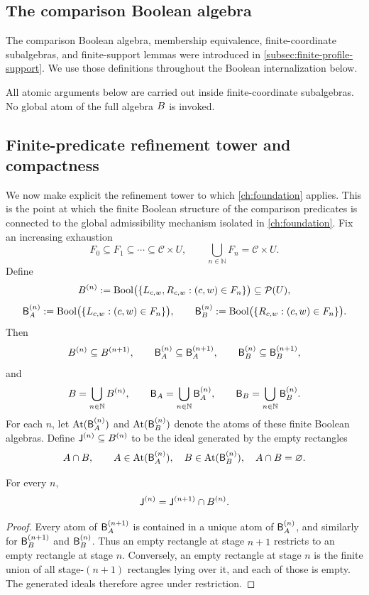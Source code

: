 \subsection{The comparison Boolean algebra}
The comparison Boolean algebra, membership equivalence, finite-coordinate
subalgebras, and finite-support lemmas were introduced in
\cref{subsec:finite-profile-support}. We use those definitions throughout
the Boolean internalization below.
\begin{remark}
	All atomic arguments below are carried out inside finite-coordinate
	subalgebras. No global atom of the full algebra \(B\) is invoked.
\end{remark}
\subsection{Finite-predicate refinement tower and compactness}
\label{subsec:refinement-compactness}
We now make explicit the refinement tower to which
\cref{ch:foundation} applies. This is the point at which the finite
Boolean structure of the comparison predicates is connected to the
global admissibility mechanism isolated in \cref{ch:foundation}.
Fix an increasing exhaustion
\[
	F_0\subseteq F_1\subseteq\cdots\subseteq \mathcal C\times U,
	\qquad
	\bigcup_{n\in\mathbb N}F_n=\mathcal C\times U.
\]
Define
\[
	B^{(n)}
	:=
	\operatorname{Bool}\bigl(\{L_{c,w},R_{c,w}:(c,w)\in F_n\}\bigr)
	\subseteq \mathcal P(U),
\]
\[
	\mathsf B_A^{(n)}
	:=
	\operatorname{Bool}\bigl(\{L_{c,w}:(c,w)\in F_n\}\bigr),
	\qquad
	\mathsf B_B^{(n)}
	:=
	\operatorname{Bool}\bigl(\{R_{c,w}:(c,w)\in F_n\}\bigr).
\]
Then
\[
	B^{(n)}\subseteq B^{(n+1)},
	\qquad
	\mathsf B_A^{(n)}\subseteq \mathsf B_A^{(n+1)},
	\qquad
	\mathsf B_B^{(n)}\subseteq \mathsf B_B^{(n+1)},
\]
and
\[
	B=\bigcup_{n\in\mathbb N}B^{(n)},
	\qquad
	\mathsf B_A=\bigcup_{n\in\mathbb N}\mathsf B_A^{(n)},
	\qquad
	\mathsf B_B=\bigcup_{n\in\mathbb N}\mathsf B_B^{(n)}.
\]
For each \(n\), let \(\mathrm{At}(\mathsf B_A^{(n)})\) and
\(\mathrm{At}(\mathsf B_B^{(n)})\) denote the atoms of these finite Boolean
algebras. Define \(\mathsf J^{(n)}\subseteq B^{(n)}\) to be the ideal
generated by the empty rectangles
\[
	A\cap B,
	\qquad
	A\in\mathrm{At}(\mathsf B_A^{(n)}),
	\quad
	B\in\mathrm{At}(\mathsf B_B^{(n)}),
	\quad
	A\cap B=\varnothing.
\]
\begin{lemma}
	For every \(n\),
	\[
		\mathsf J^{(n)}=\mathsf J^{(n+1)}\cap B^{(n)}.
	\]
\end{lemma}
\begin{proof}
	Every atom of \(\mathsf B_A^{(n+1)}\) is contained in a unique atom of
	\(\mathsf B_A^{(n)}\), and similarly for \(\mathsf B_B^{(n+1)}\) and \(\mathsf B_B^{(n)}\).
	Thus an empty rectangle at stage \(n+1\) restricts to an empty
	rectangle at stage \(n\). Conversely, an empty rectangle at stage \(n\)
	is the finite union of all stage-\((n+1)\) rectangles lying over it,
	and each of those is empty. The generated ideals therefore agree under
	restriction.
\end{proof}
